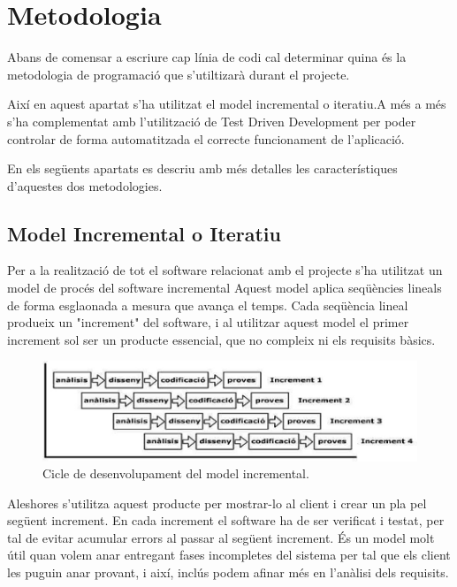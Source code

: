 \chapter{Metodologia}
\label{chap:metodologia}

Abans de comensar a escriure cap línia de codi cal determinar quina és la metodologia de programació que s'utiltizarà durant el projecte. 

Així en aquest apartat s'ha utilitzat el model incremental o iteratiu.A més a més s'ha complementat amb l'utilització de Test Driven Development per poder controlar de forma automatitzada el correcte funcionament de l'aplicació.

En els següents apartats es descriu amb més detalles les característiques d'aquestes dos metodologies.  


\section{Model Incremental o Iteratiu}

Per a la realització de tot el software relacionat amb el projecte s’ha utilitzat un model de procés del software incremental Aquest model aplica seqüències lineals de forma esglaonada a mesura que avança el temps. Cada seqüència lineal produeix un "increment" del software, i al utilitzar aquest model el primer increment sol ser un producte essencial, que no compleix ni els requisits bàsics.

\begin{figure}[htbp]
\centering\includegraphics{img/model-incremental.png}
\caption{Cicle de desenvolupament del model incremental.}
\label{fig:mii}
\end{figure} 


Aleshores s’utilitza aquest producte per mostrar-lo al client i crear un pla pel següent increment. En cada increment el software ha de ser verificat i testat, per tal de evitar acumular errors al passar al següent increment. És un model molt útil quan volem anar entregant fases incompletes del sistema per tal que els client les puguin anar provant, i així, inclús podem afinar més en l’anàlisi dels requisits.

